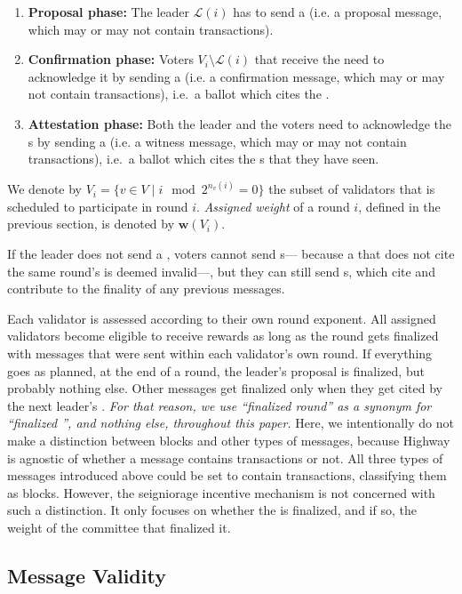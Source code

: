 \begin{enumerate}
\item \textbf{Proposal phase:}
  The leader $\mathcal{L}(i)$ has to send a \PROP{} (i.e. a proposal message, which may or may not contain transactions).
\item \textbf{Confirmation phase:}
  Voters $V_i\setminus \mathcal{L}(i)$ that receive the \PROP need to acknowledge it by sending a \CONF (i.e. a confirmation message, which may or may not contain transactions), i.e.~a ballot which cites the \PROP.
\item \textbf{Attestation phase:}
  Both the leader and the voters need to acknowledge the \CONF{}s by sending a \WIT{} (i.e. a witness message, which may or may not contain transactions), i.e.~a ballot which cites the \CONF{}s that they have seen.
\end{enumerate}

We denote by $V_{i}=\{v\in V \mid i \mod 2^{n_v(i)} = 0\}$ the subset of validators that is scheduled to participate in round $i$. \emph{Assigned weight} of a round $i$, defined in the previous section, is denoted by $\boldsymbol{w}(V_i)$.

If the leader does not send a \PROP, voters cannot send \CONF{}s--- because a \CONF that does not cite the same round's \PROP is deemed invalid---, but they can still send \WIT{}s, which cite and contribute to the finality of any previous messages.

Each validator is assessed according to their own round exponent. All assigned validators become eligible to receive rewards as long as the round gets finalized with messages that were sent within each validator's own round. If everything goes as planned, at the end of a round, the leader's proposal is finalized, but probably nothing else. Other messages get finalized only when they get cited by the next leader's \PROP. \emph{For that reason, we use ``finalized round'' as a synonym for ``finalized \PROP'', and nothing else, throughout this paper.} Here, we intentionally do not make a distinction between blocks and other types of messages, because Highway is agnostic of whether a message contains transactions or not. All three types of messages introduced above could be set to contain transactions, classifying them as blocks. However, the seigniorage incentive mechanism is not concerned with such a distinction. It only focuses on whether the \PROP is finalized, and if so, the weight of the committee that finalized it.

\subsection{Message Validity}
\label{sec:message-validity}

